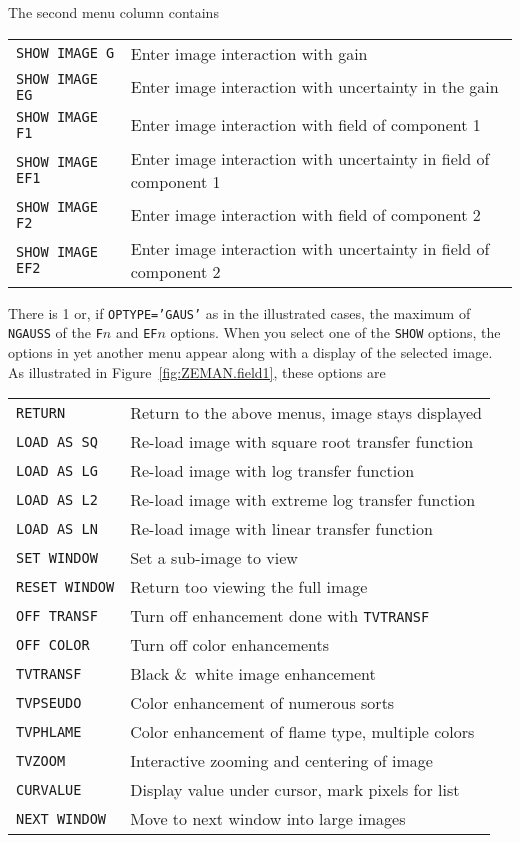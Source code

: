 \documentclass[twoside]{article}
\newcommand{\Me}[1]{\textcolor{mecol}{#1}}
\begin{document}
The second menu column contains
\begin{center}
\begin{tabular}{|l|l|}\hline
 {\tt SHOW IMAGE G } & Enter image interaction with gain\\
 {\tt SHOW IMAGE EG } & Enter image interaction with uncertainty in
                     the gain\\
 {\tt SHOW IMAGE F1 } & Enter image interaction with field of
                     component 1\\
 {\tt SHOW IMAGE EF1} & Enter image interaction with uncertainty in
                     field of component 1\\
 {\tt SHOW IMAGE F2} & Enter image interaction with field of component
                     2\\
 {\tt SHOW IMAGE EF2} & Enter image interaction with uncertainty in
                     field of component 2\\ \hline
\end{tabular}
\end{center}
There is 1 or, if {\tt OPTYPE='GAUS'} as in the illustrated cases,
the maximum of {\tt NGAUSS} of the {\tt F}$n$ and {\tt EF}$n$ options.
When you select one of the {\tt SHOW} options, the options in yet
another menu appear along with a display of the selected image.  As
illustrated in Figure~\ref{fig:ZEMAN.field1}, these options are
\begin{center}
\begin{tabular}{|l|l|}\hline
 {\tt RETURN     } & Return to the above menus, image stays displayed\\
 {\tt LOAD AS SQ } & Re-load image with square root transfer function\\
 {\tt LOAD AS LG } & Re-load image with log transfer function\\
 {\tt LOAD AS L2 } & Re-load image with extreme log transfer function\\
 {\tt LOAD AS LN } & Re-load image with linear transfer function\\
\Me{{\tt SET WINDOW}} & \Me{Set a sub-image to view}\\
\Me{{\tt RESET WINDOW}} & \Me{Return too viewing the full image}\\
 {\tt OFF TRANSF } & Turn off enhancement done with {\tt TVTRANSF}\\
 {\tt OFF COLOR  } & Turn off color enhancements\\
 {\tt TVTRANSF   } & Black \&\ white image enhancement\\
 {\tt TVPSEUDO   } & Color enhancement of numerous sorts\\
 {\tt TVPHLAME   } & Color enhancement of flame type, multiple colors\\
 {\tt TVZOOM     } & Interactive zooming and centering of image\\
 {\tt CURVALUE   } & Display value under cursor, mark pixels for list\\
 {\tt NEXT WINDOW} & Move to next window into large images\\ \hline
\end{tabular}
\end{center}
\end{document}
